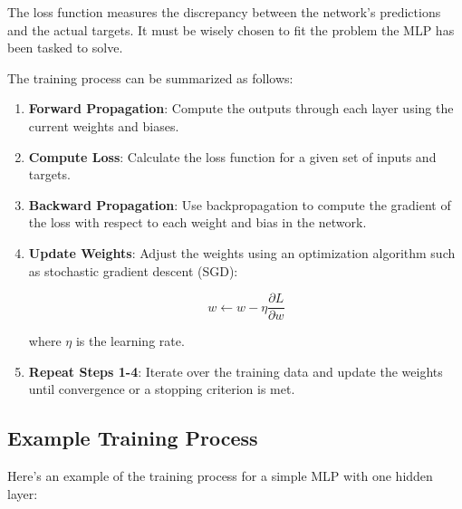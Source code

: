 \documentclass[english]{article}
\begin{document}
The loss function measures the discrepancy between the network's predictions and the actual targets. It must be wisely chosen to fit the problem the MLP has been tasked to solve.

The training process can be summarized as follows:

\begin{enumerate}
    \item \textbf{Forward Propagation}: Compute the outputs through each layer using the current weights and biases.
    \item \textbf{Compute Loss}: Calculate the loss function for a given set of inputs and targets.
    \item \textbf{Backward Propagation}: Use backpropagation to compute the gradient of the loss with respect to each weight and bias in the network.
    \item \textbf{Update Weights}: Adjust the weights using an optimization algorithm such as stochastic gradient descent (SGD):

\begin{equation}
    w \leftarrow w - \eta \frac{\partial L}{\partial w}
\end{equation}

where \( \eta \) is the learning rate.

    \item \textbf{Repeat Steps 1-4}: Iterate over the training data and update the weights until convergence or a stopping criterion is met.
\end{enumerate}

\subsection{Example Training Process}
Here's an example of the training process for a simple MLP with one hidden layer:
\end{document}
